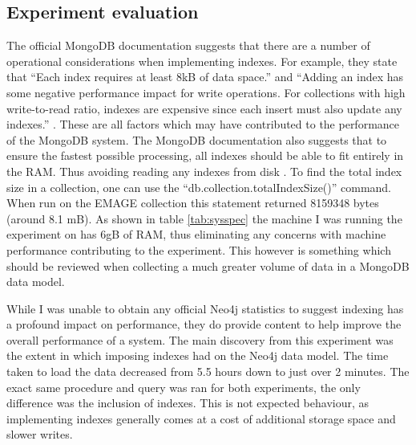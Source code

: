 \subsection{Experiment evaluation}\label{experimentdiscussion}
The official MongoDB documentation suggests that there are a number of operational considerations when implementing indexes. For example, they state that ``Each index requires at least 8kB of data space.'' and ``Adding an index has some negative performance impact for write operations. For collections with high write-to-read ratio, indexes are expensive since each insert must also update any indexes.'' \cite{mongoonline}. These are all factors which may have contributed to the performance of the MongoDB system. The MongoDB documentation also suggests that to ensure the fastest possible processing, all indexes should be able to fit entirely in the RAM. Thus avoiding reading any indexes from disk \cite{mongoonline}. To find the total index size in a collection, one can use the ``db.collection.totalIndexSize()'' command. When run on the EMAGE collection this statement returned 8159348 bytes (around 8.1 mB). As shown in table \ref{tab:sysspec} the machine I was running the experiment on has 6gB of RAM, thus eliminating any concerns with machine performance contributing to the experiment. This however is something which should be reviewed when collecting a much greater volume of data in a MongoDB data model.

While I was unable to obtain any official Neo4j statistics to suggest indexing has a profound impact on performance, they do provide content to help improve the overall performance of a system. The main discovery from this experiment was the extent in which imposing indexes had on the Neo4j data model. The time taken to load the data decreased from 5.5 hours down to just over 2 minutes. The exact same procedure and query was ran for both experiments, the only difference was the inclusion of indexes. This is not expected behaviour, as implementing indexes generally comes at a cost of additional storage space and slower writes.

